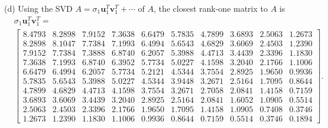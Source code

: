 \documentclass{homework}
\begin{document}
{\noindent(d) Using the SVD $A = \sigma_1 \mathbf u_1^T \mathbf v_1^T + \cdots$ of $A$, the closest rank-one matrix to $A$ is 
\begin{align*}
    &\sigma_1 \mathbf u_1^T \mathbf v_1^T = \\&\begin{bmatrix}
    8.4793  &  8.2898  &  7.9152  &  7.3638  &  6.6479  &  5.7835  &  4.7899  &  3.6893  &  2.5063  &  1.2673 \\
    8.2898  &  8.1047  &  7.7384  &  7.1993  &  6.4994  &  5.6543  &  4.6829  &  3.6069  &  2.4503  &  1.2390 \\
    7.9152  &  7.7384  &  7.3888  &  6.8740  &  6.2057  &  5.3988  &  4.4713  &  3.4439  &  2.3396  &  1.1830 \\
    7.3638  &  7.1993  &  6.8740  &  6.3952  &  5.7734  &  5.0227  &  4.1598  &  3.2040  &  2.1766  &  1.1006 \\
    6.6479  &  6.4994  &  6.2057  &  5.7734  &  5.2121  &  4.5344  &  3.7554  &  2.8925  &  1.9650  &  0.9936 \\
    5.7835  &  5.6543  &  5.3988  &  5.0227  &  4.5344  &  3.9448  &  3.2671  &  2.5164  &  1.7095  &  0.8644 \\
    4.7899  &  4.6829  &  4.4713  &  4.1598  &  3.7554  &  3.2671  &  2.7058  &  2.0841  &  1.4158  &  0.7159 \\
    3.6893  &  3.6069  &  3.4439  &  3.2040  &  2.8925  &  2.5164  &  2.0841  &  1.6052  &  1.0905  &  0.5514 \\
    2.5063  &  2.4503  &  2.3396  &  2.1766  &  1.9650  &  1.7095  &  1.4158  &  1.0905  &  0.7408  &  0.3746 \\
    1.2673  &  1.2390  &  1.1830  &  1.1006  &  0.9936  &  0.8644  &  0.7159  &  0.5514  &  0.3746  &  0.1894 
    \end{bmatrix}.
\end{align*}

}
\end{document}
